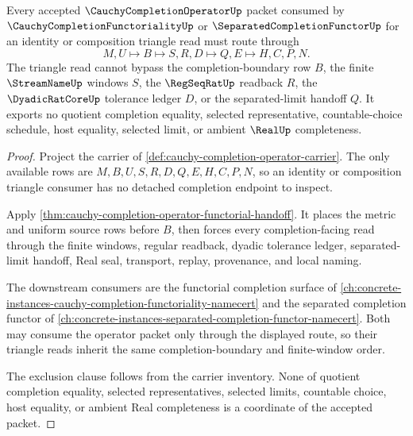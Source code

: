 \begin{theorem}
\label{thm:cauchy-completion-operator-triangle-consumption-route}
Every accepted $\CauchyCompletionOperatorUp$ packet consumed by $\CauchyCompletionFunctorialityUp$ or $\SeparatedCompletionFunctorUp$ for an identity or composition triangle read must route through
$$
M,U \longmapsto B \longmapsto S,R,D \longmapsto Q,E \longmapsto H,C,P,N .
$$
The triangle read cannot bypass the completion-boundary row $B$, the finite $\StreamNameUp$ windows $S$, the $\RegSeqRatUp$ readback $R$, the $\DyadicRatCoreUp$ tolerance ledger $D$, or the separated-limit handoff $Q$. It exports no quotient completion equality, selected representative, countable-choice schedule, host equality, selected limit, or ambient $\RealUp$ completeness.
\end{theorem}
\begin{proof}
Project the carrier of \autoref{def:cauchy-completion-operator-carrier}. The only available rows are $M,B,U,S,R,D,Q,E,H,C,P,N$, so an identity or composition triangle consumer has no detached completion endpoint to inspect.

Apply \autoref{thm:cauchy-completion-operator-functorial-handoff}. It places the metric and uniform source rows before $B$, then forces every completion-facing read through the finite windows, regular readback, dyadic tolerance ledger, separated-limit handoff, Real seal, transport, replay, provenance, and local naming.

The downstream consumers are the functorial completion surface of \autoref{ch:concrete-instances-cauchy-completion-functoriality-namecert} and the separated completion functor of \autoref{ch:concrete-instances-separated-completion-functor-namecert}. Both may consume the operator packet only through the displayed route, so their triangle reads inherit the same completion-boundary and finite-window order.

The exclusion clause follows from the carrier inventory. None of quotient completion equality, selected representatives, selected limits, countable choice, host equality, or ambient Real completeness is a coordinate of the accepted packet.
\end{proof}

